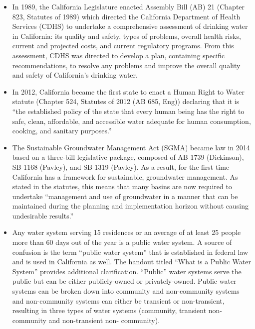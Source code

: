 \begin{itemize}
\item In 1989, the California Legislature enacted Assembly Bill (AB) 21 (Chapter 823, Statutes of 1989) which directed the California Department of Health Services (CDHS) to undertake a comprehensive assessment of drinking water in California: its quality and safety, types of problems, overall health risks, current and projected costs, and current regulatory programs. From this assessment, CDHS was directed to develop a plan, containing specific recommendations, to resolve any problems and improve the overall quality and safety of California's drinking water.
\item In 2012, California became the first state to enact a Human Right to Water statute (Chapter 524, Statutes of 2012 (AB 685, Eng)) declaring that it is “the established policy of the state that every human being has the right to safe, clean, affordable, and accessible water adequate for human consumption, cooking, and sanitary purposes.”
\item The Sustainable Groundwater Management Act (SGMA) became law in 2014 based on a three-bill legislative package, composed of AB 1739 (Dickinson), SB 1168 (Pavley), and SB 1319 (Pavley). As a result, for the first time California has a framework for sustainable, groundwater management. As stated in the statutes, this means that many basins are now required to undertake “management and use of groundwater in a manner that can be maintained during the planning and implementation horizon without causing undesirable results.”



\item Any water system serving 15 residences or an average of at least 25 people more than 60 days out of the year is a public water system. A source of confusion is the term “public water system” that is established in federal law and is used in California as well. The handout titled “What is a Public Water System” provides additional clarification. “Public” water systems serve the public but can be either publicly-owned or privately-owned.  Public water systems can be broken down into community and non-community systems and non-community systems can either be transient or non-transient, resulting in three types of water systems (community, transient non-community and non-transient non- community).


\end{itemize}
